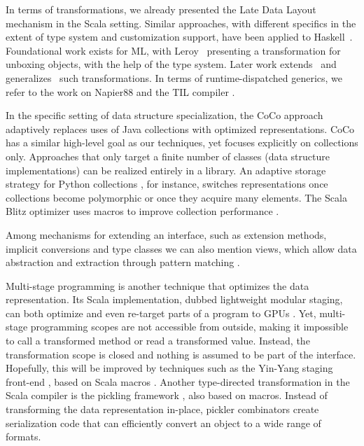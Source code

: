 In terms of transformations, we already presented the Late Data Layout mechanism in the Scala setting. Similar approaches, with different specifics in the extent of type system and customization support, have been applied to Haskell~\cite{spj-unboxed-values}. Foundational work exists for ML, with Leroy~\cite{leroy-unboxed-objects} presenting a transformation for unboxing objects, with the help of the type system. Later work extends~\cite{thiemann-unboxed-objects-cps} and generalizes~\cite{shao-flexible-representation-analysis} such transformations. In terms of runtime-dispatched generics, we refer to the work on Napier88 \cite{morrison-napier88} and the TIL compiler \cite{tarditi-til,harper-intensional-type-analysis}.

In the specific setting of data structure specialization, the CoCo approach~\cite{Xu:2013:CSA:2524984.2524986} adaptively replaces uses of Java collections with optimized representations.  CoCo has a similar high-level goal as our techniques, yet focuses explicitly on collections only. Approaches that only target a finite number of classes (data structure implementations) can be realized entirely in a library. An adaptive storage strategy for Python collections \cite{bolz-python-strategies}, for instance, switches representations once collections become polymorphic or once they acquire many elements. The Scala Blitz optimizer uses macros to improve collection performance \cite{scalablitz-paper, scalablitz}.

Among mechanisms for extending an interface, such as extension methods, implicit conversions \cite{oliveira-implicit-calculus} and type classes \cite{wadler-typeclasses} we can also mention views, which allow data abstraction and extraction through pattern matching \cite{wadler-views}.

Multi-stage programming \cite{taha-intro} is another technique that optimizes the data representation. Its Scala implementation, dubbed lightweight modular staging, can both optimize and even re-target parts of a
program to GPUs \cite{tiark-lms,delite}. Yet, multi-stage programming scopes are not accessible from outside, making it impossible to call a transformed method or read a transformed value. Instead, the transformation scope is closed and nothing is assumed to be part of the interface. Hopefully, this will be improved by techniques such as the Yin-Yang staging front-end \cite{vojin-yy}, based on Scala macros \cite{eugene-macros}. Another type-directed transformation in the Scala compiler is the pickling framework \cite{heather-pickers}, also based on macros. Instead of transforming the data representation in-place, pickler combinators create serialization code that can efficiently convert an object to a wide range of formats.
